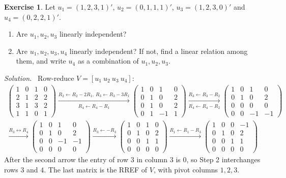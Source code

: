 \documentclass[12pt]{article}
\theoremstyle{definition}
\newtheorem{exercise}{Exercise}
\newenvironment{solution}{\par\noindent\textit{Solution.}\ }{\par\smallskip}
\begin{document}
\begin{exercise}\label{r3-ex-independence-drill}
Let \(u_1=(1,2,3,1)'\), \(u_2=(0,1,1,1)'\), \(u_3=(1,2,3,0)'\) and \(u_4=(0,2,2,1)'\).
\begin{enumerate}
\item Are \(u_1,u_2,u_3\) linearly independent?
\item Are \(u_1,u_2,u_3,u_4\) linearly independent? If not, find a linear relation among them, and
write \(u_4\) as a combination of \(u_1,u_2,u_3\).
\end{enumerate}
\end{exercise}
\begin{solution}
Row-reduce \(V=[u_1\ u_2\ u_3\ u_4]\):
\[
\begin{gathered}
\begin{pmatrix}1&0&1&0\\2&1&2&2\\3&1&3&2\\1&1&0&1\end{pmatrix}
\xrightarrow[R_4\leftarrow R_4-R_1]{R_2\leftarrow R_2-2R_1,\ R_3\leftarrow R_3-3R_1}
\begin{pmatrix}1&0&1&0\\0&1&0&2\\0&1&0&2\\0&1&-1&1\end{pmatrix}
\xrightarrow[R_4\leftarrow R_4-R_2]{R_3\leftarrow R_3-R_2}
\begin{pmatrix}1&0&1&0\\0&1&0&2\\0&0&0&0\\0&0&-1&-1\end{pmatrix}
\\
\xrightarrow{R_3\leftrightarrow R_4}
\begin{pmatrix}1&0&1&0\\0&1&0&2\\0&0&-1&-1\\0&0&0&0\end{pmatrix}
\xrightarrow{R_3\leftarrow-R_3}
\begin{pmatrix}1&0&1&0\\0&1&0&2\\0&0&1&1\\0&0&0&0\end{pmatrix}
\xrightarrow{R_1\leftarrow R_1-R_3}
\begin{pmatrix}1&0&0&-1\\0&1&0&2\\0&0&1&1\\0&0&0&0\end{pmatrix}
\end{gathered}
\]
After the second arrow the entry of row \(3\) in column \(3\) is \(0\), so Step 2 interchanges rows
\(3\) and \(4\). The last matrix is the RREF of \(V\), with pivot columns \(1,2,3\).


\end{solution}
\end{document}
